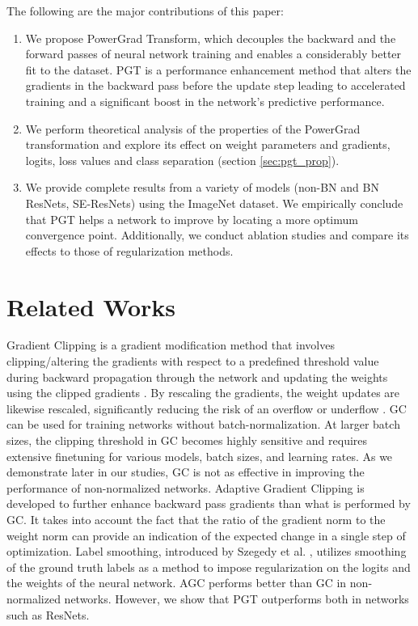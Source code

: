 \documentclass[runningheads]{llncs}
\begin{document}
The following are the major contributions of this paper:

\begin{enumerate}

\item We propose PowerGrad Transform, which decouples the backward and the forward
passes of neural network training and enables a considerably better fit to the dataset.
PGT is a performance enhancement method that alters the gradients in the backward pass
before the update step leading to accelerated training and a significant boost in the
network's predictive performance.

\item We perform theoretical analysis of the properties of the PowerGrad transformation
and explore its effect on weight parameters and gradients, logits, loss values and class
separation (section \ref{sec:pgt_prop}).

\item We provide complete results from a variety of models (non-BN and BN ResNets,
SE-ResNets) using the ImageNet dataset. We empirically conclude that PGT helps a network
to improve by locating a more optimum convergence point. Additionally, we conduct
ablation studies and compare its effects to those of regularization methods.

\end{enumerate}

\section{Related Works}
\label{sec:Rela}


Gradient Clipping \cite{pascanu2013difficulty} is a gradient modification method that
involves clipping/altering the gradients with respect to a predefined threshold value
during backward propagation through the network and updating the weights using the
clipped gradients \cite{zhang2019gradient}\cite{smith2020generalization}. By rescaling
the gradients, the weight updates are likewise rescaled, significantly reducing the risk
of an overflow or underflow \cite{pascanu2012understanding}. GC can be used for training
networks without batch-normalization. At larger batch sizes, the clipping threshold in
GC becomes highly sensitive and requires extensive finetuning for various models, batch
sizes, and learning rates. As we demonstrate later in our studies, GC is not as
effective in improving the performance of non-normalized networks. Adaptive Gradient
Clipping \cite{brock2021high} is developed to further enhance backward pass gradients
than what is performed by GC. It takes into account the fact that the ratio of the
gradient norm to the weight norm can provide an indication of the expected change in a
single step of optimization. Label smoothing, introduced by Szegedy et al.
\cite{szegedy2016rethinking}, utilizes smoothing of the ground truth labels as a method
to impose regularization on the logits and the weights of the neural network. AGC
performs better than GC in non-normalized networks. However, we show that PGT
outperforms both in networks such as ResNets.
\end{document}
